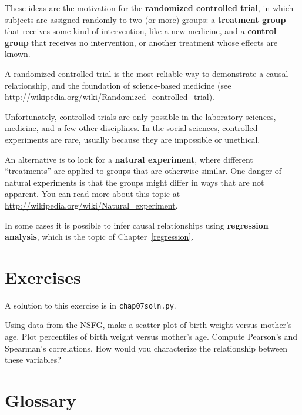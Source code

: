 \documentclass[12pt]{book}
\begin{document}
These ideas are the motivation for the {\bf randomized controlled
trial}, in which subjects are assigned randomly to two (or more)
groups: a {\bf treatment group} that receives some kind of intervention,
like a new medicine, and a {\bf control group} that receives
no intervention, or another treatment whose effects are known.

A randomized controlled trial is the most reliable way to demonstrate
a causal relationship, and the foundation of science-based medicine
(see \url{http://wikipedia.org/wiki/Randomized_controlled_trial}).

Unfortunately, controlled trials are only possible in the laboratory
sciences, medicine, and a few other disciplines.  In the social sciences,
controlled experiments are rare, usually because they are impossible
or unethical.

An alternative is to look for a {\bf natural experiment}, where
different ``treatments'' are applied to groups that are otherwise
similar.  One danger of natural experiments is that the groups might
differ in ways that are not apparent.  You can read more about this
topic at \url{http://wikipedia.org/wiki/Natural_experiment}.

In some cases it is possible to infer causal relationships using {\bf
  regression analysis}, which is the topic of Chapter~\ref{regression}.


\section{Exercises}

A solution to this exercise is in \verb"chap07soln.py".

\begin{exercise}
Using data from the NSFG, make a scatter plot of birth weight
versus mother's age.  Plot percentiles of birth weight
versus mother's age.  Compute Pearson's and Spearman's correlations.
How would you characterize the relationship
between these variables?
\end{exercise}


\section{Glossary}
\end{document}
